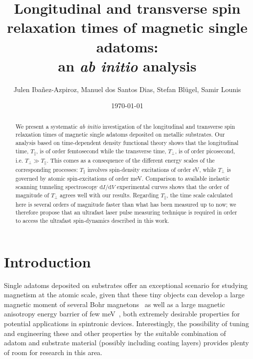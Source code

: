 \documentclass[prb,footinbib,showpacs,twocolumn,amsmath,amssymb]{revtex4}
\begin{document}
\title{Longitudinal and transverse spin relaxation times of magnetic single adatoms: \\
an \textit{ab initio} analysis}

\author{Julen Iba\~{n}ez-Azpiroz, Manuel dos Santos Dias, Stefan Bl\"ugel, Samir Lounis}
\address{Peter Gr\"unberg Institute and Institute for Advanced Simulation, Forschungszentrum
J\"ulich \& JARA, D-52425 J\"ulich, Germany}
\date{\today}


\begin{abstract}
We present a systematic \textit{ab initio} investigation of the longitudinal 
and transverse spin relaxation times of magnetic single adatoms deposited on metallic substrates. 
Our analysis based on time-dependent density
functional theory shows that the longitudinal time, $T_{\parallel}$, is of order femtosecond 
while the transverse time, $T_{\perp}$, is of order picosecond, i.e.
$T_{\perp}\gg T_{\parallel}$.
This comes as a consequence of the different energy scales of the corresponding processes:
$T_{\parallel}$ involves spin-density excitations of order eV, while
$T_{\perp}$ is governed by atomic spin-excitations of order meV.
Comparison  to  available  
inelastic scanning tunneling spectroscopy $\mathrm{d}I/\mathrm{d}V$ 
experimental curves  shows that
the order of magnitude of $T_{\perp}$ agrees well with our results. 
Regarding $T_{\parallel}$, 
the time scale calculated here is 
several orders of magnitude faster than what has been measured up to now;
we therefore propose that 
an ultrafast laser pulse measuring technique is required in order
to access the ultrafast spin-dynamics described in this work.
\end{abstract}
%
\maketitle






\section{Introduction}


Single adatoms deposited on substrates offer an exceptional 
scenario for studying magnetism at the atomic scale, given that these tiny objects 
can develop a large magnetic moment of 
several Bohr magnetons~\cite{oswald_giant_1986,wildberger_magnetic_1995,lang_local_1994}
as well as a large magnetic anisotropy energy 
barrier of few meV~\cite{gambardella_giant_2003,rau_reaching_2014,PhysRevLett.108.256811,
heinrich_single-atom_2004,hirjibehedin_spin_2006,
heinrich_tuning_2015,PhysRevLett.111.157204,PhysRevLett.114.106807,oberg_control_2014},
both extremely desirable properties for potential applications in spintronic devices.
Interestingly, the possibility of tuning and engineering these and 
other properties by the suitable combination 
of adatom and substrate material (possibly including coating layers) provides plenty of room
for research in this area.
\end{document}
